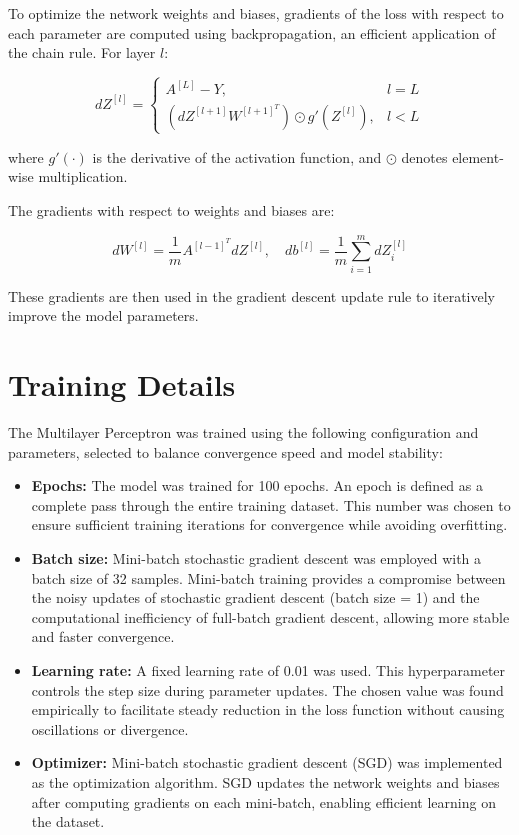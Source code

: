 \documentclass[12pt]{article}
\begin{document}
To optimize the network weights and biases, gradients of the loss with respect to each parameter are computed using backpropagation, an efficient application of the chain rule. For layer \( l \):

\[
dZ^{[l]} = 
\begin{cases}
A^{[L]} - Y, & l = L \\
(dZ^{[l+1]} W^{[l+1]^T}) \odot g'(Z^{[l]}), & l < L
\end{cases}
\]

where \( g'(\cdot) \) is the derivative of the activation function, and \( \odot \) denotes element-wise multiplication.

The gradients with respect to weights and biases are:

\[
dW^{[l]} = \frac{1}{m} A^{[l-1]^T} dZ^{[l]}, \quad db^{[l]} = \frac{1}{m} \sum_{i=1}^m dZ_i^{[l]}
\]

These gradients are then used in the gradient descent update rule to iteratively improve the model parameters.


\section{Training Details}

The Multilayer Perceptron was trained using the following configuration and parameters, selected to balance convergence speed and model stability:

\begin{itemize}
    \item \textbf{Epochs:} The model was trained for 100 epochs. An epoch is defined as a complete pass through the entire training dataset. This number was chosen to ensure sufficient training iterations for convergence while avoiding overfitting.
    
    \item \textbf{Batch size:} Mini-batch stochastic gradient descent was employed with a batch size of 32 samples. Mini-batch training provides a compromise between the noisy updates of stochastic gradient descent (batch size = 1) and the computational inefficiency of full-batch gradient descent, allowing more stable and faster convergence.
    
    \item \textbf{Learning rate:} A fixed learning rate of 0.01 was used. This hyperparameter controls the step size during parameter updates. The chosen value was found empirically to facilitate steady reduction in the loss function without causing oscillations or divergence.
    
    \item \textbf{Optimizer:} Mini-batch stochastic gradient descent (SGD) was implemented as the optimization algorithm. SGD updates the network weights and biases after computing gradients on each mini-batch, enabling efficient learning on the dataset.
\end{itemize}
\end{document}
